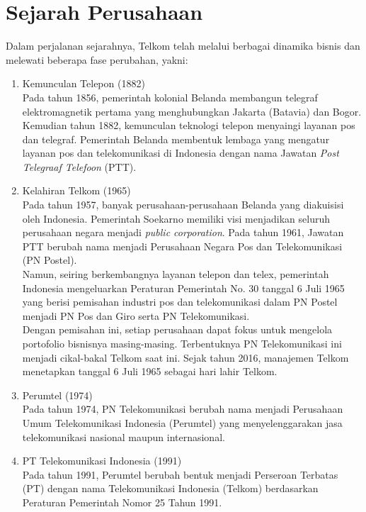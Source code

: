 \section{Sejarah Perusahaan}
\tab Dalam perjalanan sejarahnya, Telkom telah melalui berbagai dinamika bisnis dan melewati beberapa fase perubahan, yakni:
\begin{enumerate}
	\item Kemunculan Telepon (1882)\\
	\tab Pada tahun 1856, pemerintah kolonial Belanda membangun telegraf elektromagnetik pertama yang menghubungkan Jakarta (Batavia) dan Bogor. Kemudian tahun 1882, kemunculan teknologi telepon menyaingi layanan pos dan telegraf. Pemerintah Belanda membentuk lembaga yang mengatur layanan pos dan telekomunikasi di Indonesia dengan nama Jawatan \textit{Post Telegraaf Telefoon} (PTT).\\
	\item Kelahiran Telkom (1965)\\
	\tab Pada tahun 1957, banyak perusahaan-perusahaan Belanda yang diakuisisi oleh Indonesia. Pemerintah Soekarno memiliki visi menjadikan seluruh perusahaan negara menjadi \textit{public corporation}. Pada tahun 1961, Jawatan PTT berubah nama menjadi Perusahaan Negara Pos dan Telekomunikasi (PN Postel).\\
	\tab Namun, seiring berkembangnya layanan telepon dan telex, pemerintah Indonesia mengeluarkan Peraturan Pemerintah No. 30 tanggal 6 Juli 1965 yang berisi pemisahan industri pos dan telekomunikasi dalam PN Postel menjadi PN Pos dan Giro serta PN Telekomunikasi.\\
	\tab Dengan pemisahan ini, setiap perusahaan dapat fokus untuk mengelola portofolio bisnisnya masing-masing. Terbentuknya PN Telekomunikasi ini menjadi cikal-bakal Telkom saat ini. Sejak tahun 2016, manajemen Telkom menetapkan tanggal 6 Juli 1965 sebagai hari lahir Telkom.\\
	\item Perumtel (1974)\\
	\tab Pada tahun 1974, PN Telekomunikasi berubah nama menjadi Perusahaan Umum Telekomunikasi Indonesia (Perumtel) yang menyelenggarakan jasa telekomunikasi nasional maupun internasional.\\
	\item PT Telekomunikasi Indonesia (1991)\\
	\tab Pada tahun 1991, Perumtel berubah bentuk menjadi Perseroan Terbatas (PT) dengan nama Telekomunikasi Indonesia (Telkom) berdasarkan Peraturan Pemerintah Nomor 25 Tahun 1991.\\

\end{enumerate}
